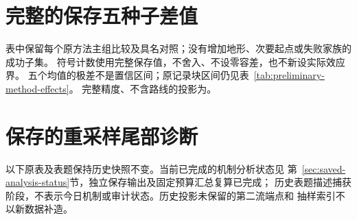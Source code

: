 \clearpage

\section{完整的保存五种子差值}
\label{sec:method-seed-table}\hypertarget{sec:method-seed-table}{}
表中保留每个原方法主组比较及具名对照；没有增加地形、次要起点或失败家族的成功子集。
符号计数使用完整保存值，不舍入、不设零容差，也不新设实际效应界。
五个均值的极差不是置信区间；原记录块区间仍见表~\ref{tab:preliminary-method-effects}。
完整精度、不含路线的投影为。


\clearpage

\section{保存的重采样尾部诊断}
\label{sec:bootstrap-table-detail}\hypertarget{sec:bootstrap-table-detail}{}
以下原表及表题保持历史快照不变。当前已完成的机制分析状态见
第~\ref{sec:saved-analysis-status}节，独立保存输出及固定预算汇总复算已完成；
历史表题描述捕获阶段，不表示今日机制或审计状态。历史投影未保留的第二流端点和
抽样索引不以新数据补造。
